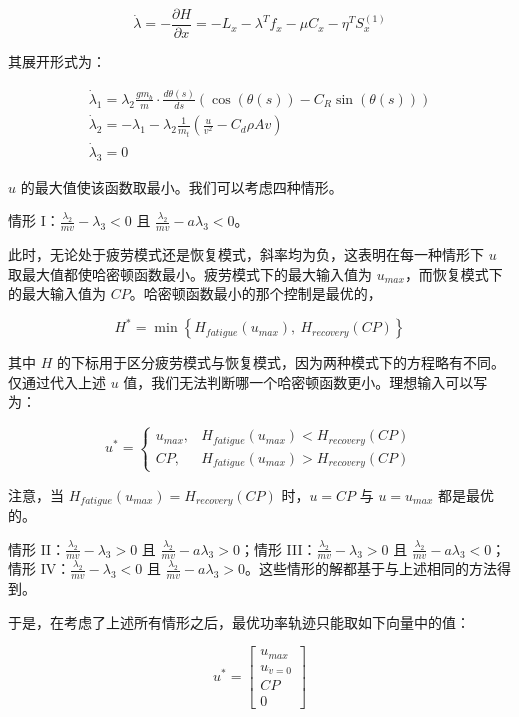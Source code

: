 \documentclass[11pt,a4paper]{ctexart}
\begin{document}
\[
\dot{\lambda}=-\frac{\partial H}{\partial x}=-L_x-\lambda^{T}f_x-\mu C_x-\eta^{T}S_x^{(1)}
\]

其展开形式为：

\[
\begin{array}{l}
\dot{\lambda}_1=\lambda_2\frac{g m_b}{m}\cdot\frac{d\theta(s)}{ds}\left(\cos(\theta(s))-C_R\sin(\theta(s))\right)\\[0.6em]
\dot{\lambda}_2=-\lambda_1-\lambda_2\frac{1}{m_t}\left(\frac{u}{v^{2}}-C_d\rho Av\right)\\[0.6em]
\dot{\lambda}_3=0
\end{array}
\]

$u$ 的最大值使该函数取最小。我们可以考虑四种情形。

情形 I：$\frac{\lambda_2}{mv}-\lambda_3<0$ 且 $\frac{\lambda_2}{mv}-a\lambda_3<0$。

此时，无论处于疲劳模式还是恢复模式，斜率均为负，这表明在每一种情形下 $u$ 取最大值都使哈密顿函数最小。疲劳模式下的最大输入值为 $u_{max}$，而恢复模式下的最大输入值为 $CP$。哈密顿函数最小的那个控制是最优的，

\[
H^{*}=\min\left\{H_{fatigue}\left(u_{max}\right),\ H_{recovery}\left(CP\right)\right\}
\]

其中 $H$ 的下标用于区分疲劳模式与恢复模式，因为两种模式下的方程略有不同。仅通过代入上述 $u$ 值，我们无法判断哪一个哈密顿函数更小。理想输入可以写为：

\[
u^{*}=\left\{\begin{array}{ll}u_{max}, & H_{fatigue}\left(u_{max}\right)<H_{recovery}\left(CP\right)\\[0.2em] CP, & H_{fatigue}\left(u_{max}\right)>H_{recovery}\left(CP\right)\end{array}\right.
\]

注意，当 $H_{fatigue}(u_{max})=H_{recovery}(CP)$ 时，$u=CP$ 与 $u=u_{max}$ 都是最优的。

情形 II：$\frac{\lambda_2}{mv}-\lambda_3>0$ 且 $\frac{\lambda_2}{mv}-a\lambda_3>0$；情形 III：$\frac{\lambda_2}{mv}-\lambda_3>0$ 且 $\frac{\lambda_2}{mv}-a\lambda_3<0$；情形 IV：$\frac{\lambda_2}{mv}-\lambda_3<0$ 且 $\frac{\lambda_2}{mv}-a\lambda_3>0$。这些情形的解都基于与上述相同的方法得到。

于是，在考虑了上述所有情形之后，最优功率轨迹只能取如下向量中的值：

\[
u^{*}=\left[\begin{array}{c}u_{max}\\ u_{\dot{v}=0}\\ CP\\ 0\end{array}\right]
\]
\end{document}
